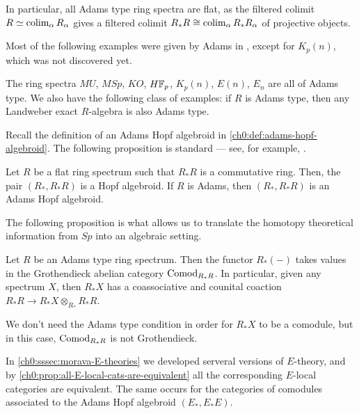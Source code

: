 In particular, all Adams type ring spectra are flat, as the filtered colimit $R\simeq \operatorname{colim}_\alpha R_\alpha$ gives a filtered colimit $R_*R\cong \operatorname{colim}_\alpha R_*R_\alpha$ of projective objects. 

Most of the following examples were given by Adams in \cite[III.13.4]{adams_74}, except for $K_p(n)$, which was not discovered yet. 

\begin{example}
    The ring spectra $MU$, $MSp$, $KO$, $H\mathbb{F}_p$, $K_p(n)$, $E(n)$, $E_n$ are all of Adams type. We also have the following class of examples: if $R$ is Adams type, then any Landweber exact $R$-algebra is also Adams type. 
\end{example}

Recall the definition of an Adams Hopf algebroid in \cref{ch0:def:adams-hopf-algebroid}. The following proposition is standard --- see, for example, \cite[1.4.6]{hovey_04}. 

\begin{proposition}
    \label{ch0:prop:hopf-algebroid-from-spectra}
    Let $R$ be a flat ring spectrum such that $R_*R$ is a commutative ring. Then, the pair $(R_*, R_*R)$ is a Hopf algebroid. If $R$ is Adams, then $(R_*, R_*R)$ is an Adams Hopf algebroid. 
\end{proposition}

The following proposition is what allows us to translate the homotopy theoretical information from $Sp$ into an algebraic setting. 

\begin{proposition}
    \label{ch0:prop:R-homology-values-in-comodules}
    Let $R$ be an Adams type ring spectrum. Then the functor $R_*(-)$ takes values in the Grothendieck abelian category $\mathrm{Comod}_{R_*R}$. In particular, given any spectrum $X$, then $R_*X$ has a coassociative and counital coaction $R_*R\longrightarrow R_*X\otimes_{R_*}R_*R$. 
\end{proposition}

\begin{remark}
    We don't need the Adams type condition in order for $R_*X$ to be a comodule, but in this case, $\mathrm{Comod}_{R_*R}$ is not Grothendieck. 
\end{remark}

In \cref{ch0:sssec:morava-E-theories} we developed serveral versions of $E$-theory, and by \cref{ch0:prop:all-E-local-cats-are-equivalent} all the corresponding $E$-local categories are equivalent. The same occurs for the categories of comodules associated to the Adams Hopf algebroid $(E_*, E_*E)$.

